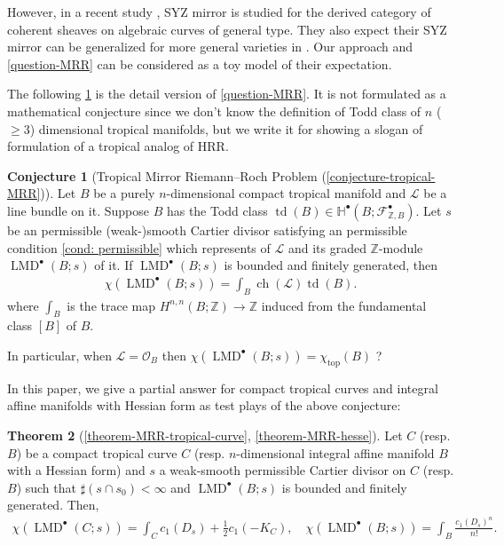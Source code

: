 \documentclass[a4paper,dvipdfmx,reqno,12pt]{amsart}
\theoremstyle{definition}
\newtheorem{theorem}{Theorem}[section]
\newtheorem{conjecture}[theorem]{Conjecture}
\newcommand{\Z}{\mathbb{Z}}%
\newcommand{\mb}[1]{\mathbb{#1}}%
\newcommand{\mcal}[1]{\mathcal{#1}}%
\newcommand{\opn}[1]{\operatorname{#1}}
\numberwithin{equation}{section}
\begin{document}
However, in a recent study 
\cite{auroux2022lagrangian}, 
SYZ mirror is studied for the derived category 
of coherent sheaves on algebraic curves 
of general type. 
They also expect their SYZ mirror can be generalized for more
general varieties in \cite[{}]{auroux2022lagrangian}.
Our approach and \cref{question-MRR} can be considered as 
a toy model of their expectation. 

The following \cref{conjecture-tropical-MRR-preface}
is the detail version of \cref{question-MRR}.
It is not formulated as a mathematical 
conjecture since we don't know the definition of Todd 
class of $n$ ($\geq 3$) dimensional tropical manifolds,
but we write it for showing a slogan of formulation 
of a tropical analog of HRR.

\begin{conjecture}[{Tropical Mirror Riemann--Roch Problem
(\cref{conjecture-tropical-MRR})}]
\label{conjecture-tropical-MRR-preface}
Let $B$ be a purely $n$-dimensional compact tropical manifold and $\mcal{L}$
be a line bundle on it. Suppose $B$ has the Todd class
$\opn{td}(B) \in \mb{H}^{\bullet}(B;\mcal{F}_{\Z, B}^{\bullet})$.
 Let $s$ be an permissible (weak-)smooth Cartier divisor satisfying an permissible condition 
\cref{cond: permissible} which represents of $\mcal{L}$
and its graded $\Z$-module $\opn{LMD}^{\bullet}(B;s)$
of it. If $\opn{LMD}^{\bullet}(B;s)$ is bounded and 
finitely generated, then
\begin{align}
\chi(\opn{LMD}^{\bullet}(B;s))=\int_B \opn{ch}(\mcal{L})\opn{td}(B).
\end{align}
where $\int_B$ is the trace map 
$H^{n,n}(B;\mathbb{Z})\to \mathbb{Z}$
induced from the fundamental class $[B]$ of $B$.

In particular, when $\mcal{L}=\mcal{O}_B$ then
$\chi(\opn{LMD}^{\bullet}(B;s))=\chi_{\opn{top}}(B)$ ?
\end{conjecture}



In this paper, we give a partial answer for compact tropical curves 
and integral affine manifolds with Hessian form
as test plays of the above conjecture:

\begin{theorem}[{\cref{theorem-MRR-tropical-curve},
\cref{theorem-MRR-hesse}}] \label{thm: main}
Let $C$ (resp. $B$) be a compact tropical curve $C$ 
(resp. $n$-dimensional integral 
affine manifold $B$
with a Hessian form) and $s$ a
weak-smooth permissible 
Cartier divisor on $C$ (resp. $B$) such that 
$\sharp(s\cap s_0)<\infty$ and 
$\opn{LMD}^{\bullet}(B;s)$ is bounded and 
finitely generated. Then,
\begin{align}
\chi(\opn{LMD}^{\bullet}(C;s))=\int_C c_1(D_s)+\frac{1}{2}c_1(-K_C), \quad 
\chi(\opn{LMD}^{\bullet}(B;s))=\int_B \frac{c_1(D_s)^{n}}{n!}.
\end{align}
\end{theorem}
\end{document}
